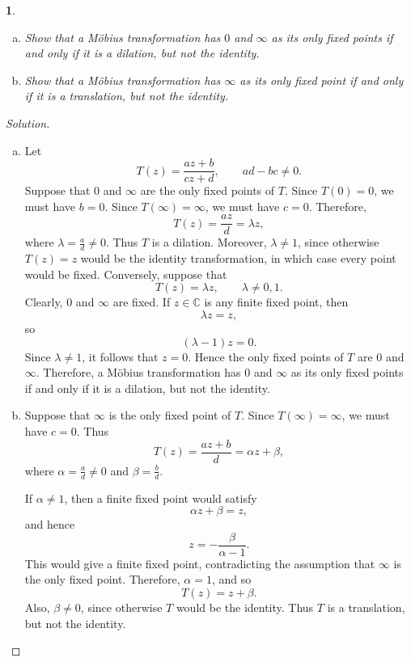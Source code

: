 \documentclass[12pt, a4paper]{report}
\theoremstyle{spaced}
\newtheorem{exercise}{}
\begin{document}
\begin{exercise}
	\begin{enumerate}[(a)]
		\item Show that a M\"obius transformation has $0$ and $\infty$ as its only fixed points if and only if it is a dilation, but not the identity.

		\item Show that a M\"obius transformation has $\infty$ as its only fixed point if and only if it is a translation, but not the identity.
	\end{enumerate}
\end{exercise}
\begin{proof}[Solution]
	\begin{enumerate}[(a)]
		\item Let
		      \[
			      T(z)=\frac{az+b}{cz+d},
			      \qquad ad-bc\neq 0.
		      \]
		      Suppose that $0$ and $\infty$ are the only fixed points of $T$.
		      Since $T(0)=0$, we must have $b=0$. Since $T(\infty)=\infty$, we must have $c=0$. Therefore,
		      \[
			      T(z)=\frac{az}{d}=\lambda z,
		      \]
		      where $\lambda=\frac{a}{d}\neq 0$. Thus $T$ is a dilation.
		      Moreover, $\lambda\neq 1$, since otherwise $T(z)=z$ would be the identity transformation, in which case every point would be fixed.
		      Conversely, suppose that
		      \[
			      T(z)=\lambda z,
			      \qquad \lambda\neq 0,1.
		      \]
		      Clearly, $0$ and $\infty$ are fixed. If $z\in\mathbb{C}$ is any finite fixed point, then
		      \[
			      \lambda z=z,
		      \]
		      so
		      \[
			      (\lambda-1)z=0.
		      \]
		      Since $\lambda\neq 1$, it follows that $z=0$. Hence the only fixed points of $T$ are $0$ and $\infty$.
		      Therefore, a M\"obius transformation has $0$ and $\infty$ as its only fixed points if and only if it is a dilation, but not the identity.

		\item Suppose that $\infty$ is the only fixed point of $T$. Since $T(\infty)=\infty$, we must have $c=0$. Thus
		      \[
			      T(z)=\frac{az+b}{d}=\alpha z+\beta,
		      \]
		      where $\alpha=\frac{a}{d}\neq 0$ and $\beta=\frac{b}{d}$.

		      If $\alpha\neq 1$, then a finite fixed point would satisfy
		      \[
			      \alpha z+\beta=z,
		      \]
		      and hence
		      \[
			      z=-\frac{\beta}{\alpha-1}.
		      \]
		      This would give a finite fixed point, contradicting the assumption that $\infty$ is the only fixed point. Therefore, $\alpha=1$, and so
		      \[
			      T(z)=z+\beta.
		      \]
		      Also, $\beta\neq 0$, since otherwise $T$ would be the identity. Thus $T$ is a translation, but not the identity.


\end{enumerate}
\end{proof}
\end{document}

